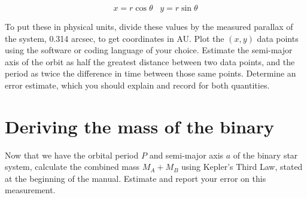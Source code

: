 \begin{equation}
x = r\cos\theta\;\;\;y = r\sin\theta
\end{equation}

To put these in physical units, divide these values by the measured parallax of the system, 0.314 arcsec, to get coordinates in AU. Plot the $(x,y)$ data points using the software or coding language of your choice.  Estimate the semi-major axis of the orbit as half the greatest distance between two data points, and the period as twice the difference in time between those same points. Determine an error estimate, which you should explain and record for both quantities.

\section{Deriving the mass of the binary}

Now that we have the orbital period $P$ and semi-major axis $a$ of the binary star system, calculate the combined mass $M_A + M_B$ using Kepler's Third Law, stated at the beginning of the manual. Estimate and report your error on this measurement. 


